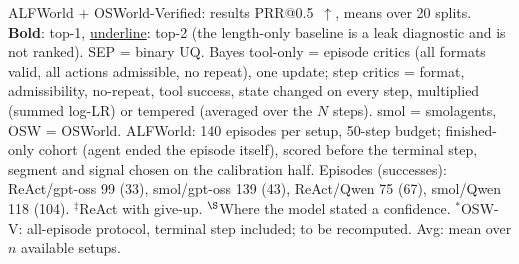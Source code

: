 \documentclass[10pt, aspectratio=43]{beamer}
\begin{document}
\begin{frame}{ALFWorld + OSWorld-Verified: results}
\vspace{0.25em}
\fontsize{6}{7}\selectfont
PRR@0.5~$\uparrow$, means over 20 splits. \textbf{Bold}: top-1, \underline{underline}: top-2
(the length-only baseline is a leak diagnostic and is not ranked). SEP = binary UQ. Bayes tool-only = episode critics (all formats valid, all actions admissible, no repeat), one update; step critics = format, admissibility, no-repeat, tool success, state changed on every step, multiplied (summed log-LR) or tempered (averaged over the $N$ steps). smol = smolagents, OSW = OSWorld.
ALFWorld: 140 episodes per setup, 50-step budget; finished-only cohort (agent ended the
episode itself), scored before the terminal step, segment and signal chosen on the
calibration half. Episodes (successes): ReAct/gpt-oss 99 (33), smol/gpt-oss 139 (43),
ReAct/Qwen 75 (67), smol/Qwen 118 (104).
$^\ddagger$ReAct with give-up. $^\S$Where the model stated a confidence.
$^\ast$OSW-V: all-episode protocol, terminal step included; to be recomputed.
Avg: mean over $n$ available setups.
\end{frame}
\end{document}
